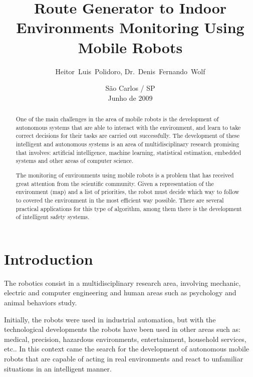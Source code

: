 \documentclass[9pt,journal]{IEEEtran}
\begin{document}
	\title{Route Generator to Indoor Environments Monitoring Using Mobile Robots}
	\author{Heitor~Luis~Polidoro, Dr.~Denis~Fernando~Wolf}
	\date{São Carlos / SP\\Junho de 2009}
	\maketitle

	\begin{abstract}
One of the main challenges in the area of mobile robots is the development of autonomous systems that are able to interact with the environment, and learn to take correct decisions for their tasks are carried out successfully. The development of these intelligent and autonomous systems is an area of multidisciplinary research promising that involves: artificial intelligence, machine learning, statistical estimation, embedded systems and other areas of computer science.
	
The monitoring of environments using mobile robots is a problem that has received great attention from the scientific community. Given a representation of the environment (map) and a list of priorities, the robot must decide which way to follow to covered the environment in the most efficient way possible. There are several practical applications for this type of algorithm, among them there is the development of intelligent safety systems.
	\end{abstract}

	\section{Introduction}

The robotics consist in a multidisciplinary research area, involving mechanic, electric and computer engineering and human areas such as psychology and animal behaviors study.

Initially, the robots were used in industrial automation, but with the technological developments the robots have been used in other areas such as: medical, precision, hazardous environments, entertainment, household services, etc.. In this context came the search for the development of autonomous mobile robots that are capable of acting in real environments and react to unfamiliar situations in an intelligent manner.
\end{document}
